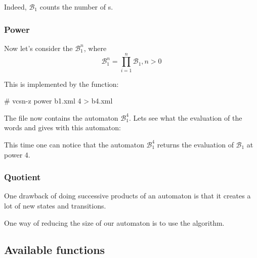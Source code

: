 
\noindent
Indeed, $\mathcal{B}_1$ counts the number of s.

\subsubsection{Power}

Now let's consider the $\mathcal{B}_1^n$, where
\begin{displaymath}
  \mathcal{B}_1^n = \prod_{i=1}^n \mathcal{B}_1, n > 0
\end{displaymath}

\noindent
This is implemented by the  function:

\begin{shell}
# vcsn-z power b1.xml 4 > b4.xml
\end{shell}

\noindent
The file  now contains the automaton $\mathcal{B}_1^4$.
Lets see what the evaluation of the words  and 
gives with this automaton:


This time one can notice that the automaton $\mathcal{B}_1^4$ returns
the evaluation of $\mathcal{B}_1$ at power 4.

\subsubsection{Quotient}

One drawback of doing successive products of an automaton is
that it creates a lot of new states and transitions.


One way of reducing the size of our automaton is to use the
 algorithm.


\subsection{Available functions}

